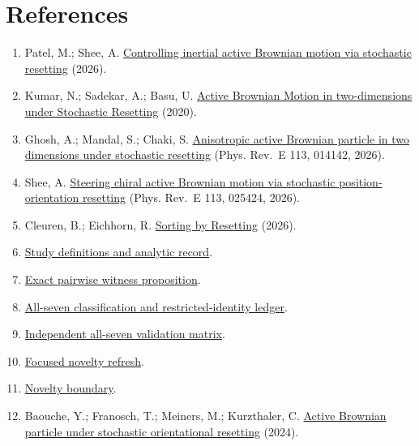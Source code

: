 \section{References}\label{references}

\begin{enumerate}
\def\labelenumi{\arabic{enumi}.}
\tightlist
\item
  Patel, M.; Shee, A. \href{https://arxiv.org/abs/2602.21134}{Controlling inertial active Brownian motion via stochastic resetting} (2026).
\item
  Kumar, N.; Sadekar, A.; Basu, U. \href{https://arxiv.org/abs/2008.03294}{Active Brownian Motion in two-dimensions under Stochastic Resetting} (2020).
\item
  Ghosh, A.; Mandal, S.; Chaki, S. \href{https://arxiv.org/abs/2501.05149}{Anisotropic active Brownian particle in two dimensions under stochastic resetting} (Phys. Rev.~E 113, 014142, 2026).
\item
  Shee, A. \href{https://arxiv.org/abs/2508.12223}{Steering chiral active Brownian motion via stochastic position-orientation resetting} (Phys. Rev.~E 113, 025424, 2026).
\item
  Cleuren, B.; Eichhorn, R. \href{https://arxiv.org/abs/2603.19430}{Sorting by Resetting} (2026).
\item
  \href{https://github.com/blakepi/phasemap-reproducibility/blob/v3.1.1/docs/scientific-contract/CONTRACT.md}{Study definitions and analytic record}.
\item
  \href{https://github.com/blakepi/phasemap-reproducibility/blob/v3.1.1/artifacts/derived/T-030-memory-channel-proposition.md}{Exact pairwise witness proposition}.
\item
  \href{https://github.com/blakepi/phasemap-reproducibility/blob/v3.1.1/artifacts/derived/V-020-equivalence-map.md}{All-seven classification and restricted-identity ledger}.
\item
  \href{https://github.com/blakepi/phasemap-reproducibility/blob/v3.1.1/artifacts/derived/S-021-validation-matrix.md}{Independent all-seven validation matrix}.
\item
  \href{https://github.com/blakepi/phasemap-reproducibility/blob/v3.1.1/literature-audit/G4_NOVELTY_REFRESH_2026-07-24.md}{Focused novelty refresh}.
\item
  \href{https://github.com/blakepi/phasemap-reproducibility/blob/v3.1.1/literature-audit/NOVELTY_BOUNDARY.md}{Novelty boundary}.
\item
  Baouche, Y.; Franosch, T.; Meiners, M.; Kurzthaler, C. \href{https://arxiv.org/abs/2405.06769}{Active Brownian particle under stochastic orientational resetting} (2024).

\end{enumerate}
